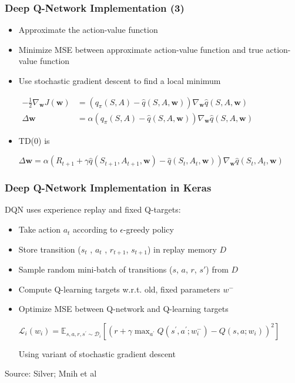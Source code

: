 \documentclass{beamer}
\begin{document}
\begin{frame}
\frametitle{Deep Q-Network Implementation (3)}
\begin{itemize}
	\item Approximate the action-value function
	
	\item Minimize MSE between approximate
	action-value function and true action-value function
	
	\item Use stochastic gradient descent to find a local minimum
	
	$\begin{aligned}-\frac{1}{2} \nabla_{\mathbf{w}} J(\mathbf{w}) &=\left(q_{\pi}(S, A)-\hat{q}(S, A, \mathbf{w})\right) \nabla_{\mathbf{w}} \hat{q}(S, A, \mathbf{w}) \\ \Delta \mathbf{w} &=\alpha\left(q_{\pi}(S, A)-\hat{q}(S, A, \mathbf{w})\right) \nabla_{\mathbf{w}} \hat{q}(S, A, \mathbf{w}) \end{aligned}$
	
	\item TD(0) is
	
	$\Delta \mathbf{w}=\alpha\left(R_{t+1}+\gamma \hat{q}\left(S_{t+1}, A_{t+1}, \mathbf{w}\right)-\hat{q}\left(S_{t}, A_{t}, \mathbf{w}\right)\right) \nabla_{\mathbf{w}} \hat{q}\left(S_{t}, A_{t}, \mathbf{w}\right)$
	
	
\end{itemize}
\end{frame}


\begin{frame}
\frametitle{Deep Q-Network Implementation in Keras}
DQN uses experience replay and fixed Q-targets:

\begin{itemize}
	\item Take action $a_t$ according to 
	$\epsilon$-greedy policy
	
	\item Store transition ($s_t$ , $a_t$ , $r_{t+1}$, $s_{t+1}$) 
	in replay memory $D$
	
	\item Sample random mini-batch of transitions ($s$, $a$, $r$, $s'$) from $D$
	
	\item Compute Q-learning targets w.r.t. old, fixed parameters $w^{-}$
	
	\item Optimize MSE between Q-network and Q-learning targets
	
	$\mathcal{L}_{i}\left(w_{i}\right)=\mathbb{E}_{s, a, r, s^{\prime} \sim \mathcal{D}_{i}}\left[\left(r+\gamma \max _{a^{\prime}} Q\left(s^{\prime}, a^{\prime} ; w_{i}^{-}\right)-Q\left(s, a ; w_{i}\right)\right)^{2}\right]$
	
	Using variant of stochastic gradient descent
		
\end{itemize}


Source: Silver; Mnih et al

\end{frame}
\end{document}
